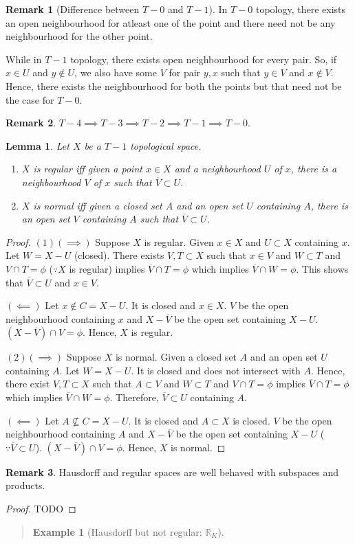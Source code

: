 \documentclass[12pt,reqno]{amsart}
\theoremstyle{plain}
\newtheorem{lem}{Lemma}
\theoremstyle{definition}
\newtheorem{eg}{Example}
\newtheorem{rem}{Remark}
\newcommand{\bb}[1]{\mathbb{#1}}
\begin{document}
\begin{rem}[Difference between $T-0$ and $T-1$]
    In $T-0$ topology, there exists an open neighbourhood for atleast one of the point and there need not be any neighbourhood for the other point.

    While in $T-1$ topology, there exists open neighbourhood for every pair. So, if $x \in U$ and $y \notin U$, we also have some $V$ for pair $y,x$ such that $y \in V$ and $x \notin V$. Hence, there exists the neighbourhood for both the points but that need not be the case for $T-0$. 
\end{rem}
\begin{rem}
    $T-4 \implies T-3 \implies T-2 \implies T-1 \implies T-0$. 
\end{rem}
\begin{lem}
    Let $X$ be a $T-1$ topological space.
    \begin{enumerate}
        \item $X$ is regular iff given a point $x \in X$ and a neighbourhood $U$ of $x$, there is a neighbourhood $V$ of $x$ such that $\overline{V} \subset U$.
        \item $X$ is normal iff given a closed set $A$ and an open set $U$ containing $A$, there is an open set $V$ containing $A$ such that $\overline{V} \subset U$.
    \end{enumerate}
\end{lem}
\begin{proof}
    $(1) (\implies)$ Suppose $X$ is regular. Given $x \in X$ and $U \subset X$ containing $x$. Let $W = X - U$ (closed). There exists $V,T \subset X$ such that $x \in V$ and $W \subset T$ and $V \cap T = \phi$ ($\because X$ is regular) implies $\overline{V} \cap T = \phi$ which implies $\overline{V} \cap W = \phi$. This shows that $ \overline{V} \subset U$ and $x \in V$.

    \noindent $(\impliedby)$ Let $x \notin C = X - U$. It is closed and $x\in X$. $V$ be the open neighbourhood containing $x$ and $X - \overline{V}$ be the open set containing $X - U$. $(X - \overline{V}) \cap V = \phi$. Hence, $X$ is regular.

    $(2) (\implies)$ Suppose $X$ is normal. Given a closed set $A$ and an open set $U$ containing $A$. Let $W = X - U$. It is closed and does not intersect with $A$. Hence, there exist $V,T \subset X$ such that $A \subset V$ and $W \subset T$ and $V \cap T = \phi$ implies $\overline{V} \cap T = \phi$ which implies $\overline{V} \cap W = \phi$. Therefore, $\overline{V} \subset U$ containing $A$.

    \noindent $(\impliedby)$ Let $A \nsubseteq C = X - U$. It is closed and $A\subset X$ is closed. $V$ be the open neighbourhood containing $A$ and $X - \overline{V}$ be the open set containing $X - U$ ($\because \overline{V} \subset U$). $(X - \overline{V}) \cap V = \phi$. Hence, $X$ is normal.
\end{proof}
\begin{rem}
    Hausdorff and regular spaces are well behaved with subspaces and products.
\end{rem}
\begin{proof}
    TODO
\end{proof}
\begin{quotation}
    \begin{eg}[Hausdorff but not regular: $\bb R_K$]

    \end{eg}
\end{quotation}
\end{document}
